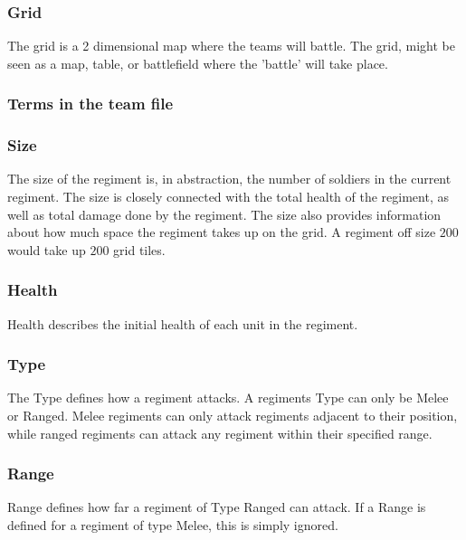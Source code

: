 		\subsubsection{Grid}
		The grid is a 2 dimensional map where the teams will battle.
		The grid, might be seen as a map, table, or battlefield where the 'battle' will take place. 
																		
		\subsubsection{Terms in the team file }
	
		\subsubsection{Size}
		The size of the regiment is, in abstraction, the number of soldiers in the current regiment. 
		The size is closely connected with the total health of the regiment, as well as total damage done by the regiment.
		The size also provides information about how much space the regiment takes up on the grid. A regiment off size $200$ would take up $200$ grid tiles.

		\subsubsection{Health}
		Health describes the initial health of each unit in the regiment.
		
		\subsubsection{Type}
		The Type defines how a regiment attacks. A regiments Type can only be Melee or Ranged.
		Melee regiments can only attack regiments adjacent to their position, while ranged regiments 
		can attack any regiment within their specified range.
		
		\subsubsection{Range}
		Range defines how far a regiment of Type Ranged can attack. 
		If a Range is defined for a regiment of type Melee, this is simply ignored.
		
